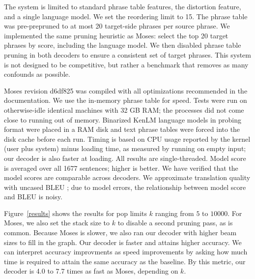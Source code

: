 \documentclass[11pt]{article}
\begin{document}
The system is limited to standard phrase table features, the distortion feature, and a single language model.  We set the reordering limit to 15.   The phrase table was pre-prepruned to at most 20 target-side phrases per source phrase.  We implemented the same pruning heuristic as Moses: select the top 20 target phrases by score, including the language model.  We then disabled phrase table pruning in both decoders to ensure a consistent set of target phrases.  This system is not designed to be competitive, but rather a benchmark that removes as many confounds as possible.

Moses \cite{moses} revision d6df825 was compiled with all optimizations recommended in the documentation.  We use the in-memory phrase table for speed.  Tests were run on otherwise-idle identical machines with 32 GB RAM; the processes did not come close to running out of memory.  Binarized KenLM language models in probing format were placed in a RAM disk and text phrase tables were forced into the disk cache before each run.  Timing is based on CPU usage reported by the kernel (user plus system) minus loading time, as measured by running on empty input; our decoder is also faster at loading.  All results are single-threaded.  Model score is averaged over all 1677 sentences; higher is better.  We have verified that the model scores are comparable across decoders.  We approximate translation quality with uncased BLEU \cite{bleu}; due to model errors, the relationship between model score and BLEU is noisy.  

Figure~\ref{results} shows the results for pop limits $k$ ranging from $5$ to $10000$.  For Moses, we also set the stack size to $k$ to disable a second pruning pass, as is common.  Because Moses is slower, we also ran our decoder with higher beam sizes to fill in the graph.  Our decoder is faster and attains higher accuracy.  We can interpret accuracy improvments as speed improvements by asking how much time is required to attain the same accuracy as the baseline.  By this metric, our decoder is 4.0 to 7.7 times as fast as Moses, depending on $k$.  
\end{document}
